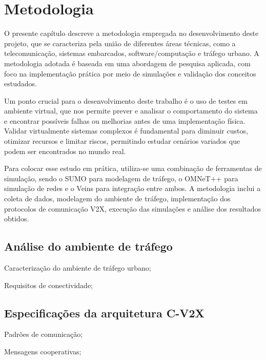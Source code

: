 \chapter{Metodologia}

O presente capítulo descreve a metodologia empregada no desenvolvimento deste projeto, que se caracteriza pela união de diferentes áreas técnicas, como
a telecomunicação, sistemas embarcados, software/computação e tráfego urbano. A metodologia adotada é baseada em uma abordagem de pesquisa aplicada,
com foco na implementação prática por meio de simulações e validação dos conceitos estudados.

Um ponto crucial para o desenvolvimento deste trabalho é o uso de testes em ambiente virtual, que nos permite prever e analisar o comportamento do
sistema e encontrar possíveis falhas ou melhorias antes de uma implementação física. Validar virtualmente sistemas complexos é fundamental para
diminuir custos, otimizar recursos e limitar riscos, permitindo estudar cenários variados que podem ser encontrados no mundo real.

Para colocar esse estudo em prática, utiliza-se uma combinação de ferramentas de simulação, sendo o SUMO para modelagem de tráfego, o OMNeT++ para
simulação de redes e o Veins para integração entre ambos. A metodologia inclui a coleta de dados, modelagem do ambiente de tráfego, implementação
dos protocolos de comunicação V2X, execução das simulações e análise dos resultados obtidos.

\section{Análise do ambiente de tráfego}

\begin{alineas}
    \item Caracterização do ambiente de tráfego urbano;
    \item Requisitos de conectividade;
\end{alineas}

\section{Especificações da arquitetura C-V2X}
\begin{alineas}
    \item Padrões de comunicação;
    \item Mensagens cooperativas;
\end{alineas}

